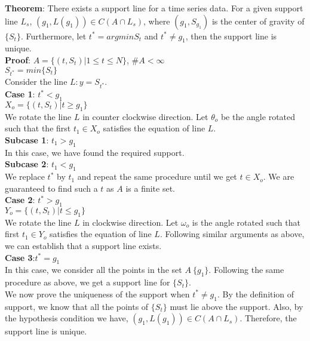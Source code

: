\documentclass{article}
\begin{document}
\maketitle

\noindent
\textbf{Theorem}: There exists a support line for a time series data. For a given support line $L_s$, $(g_1,L(g_1))\in C(A \cap L_s)$, where $(g_1,S_{g_1})$ is the center of gravity of $\{ S_t\}$. Furthermore, let $t^*=argmin S_t$ and $t^*\ne g_1$, then the support line is unique.\\

\noindent
\textbf{Proof}: $A=\{(t,S_t)|1\leq t\leq N\}$, $\# A<\infty$\\
$S_{t^*}=min\{ S_t\}$\\
Consider the line $L:y=S_{t^*}$.\\

\textbf{Case 1}: $t^*<g_1$\\
$X_o=\{(t,S_t)|t\geq g_1\}$\\
We rotate the line $L$ in counter clockwise direction.
Let $\theta_o$ be the angle rotated such that the first $t_1\in X_o$ satisfies the equation of line $L$.\\
\textbf{Subcase 1}: $t_1>g_1$\\
In this case, we have found the required support.\\
\textbf{Subcase 2}: $t_1<g_1$\\
We replace $t^*$ by $t_1$ and repeat the same procedure until we get $t\in X_o$. We are guaranteed to find such a $t$ as $A$ is a finite set.\\

\textbf{Case 2}: $t^*>g_1$\\
$Y_o=\{(t,S_t)|t\leq g_1\}$\\
We rotate the line $L$ in clockwise direction. Let $\omega_o$ is the angle rotated such that first $t_1\in Y_o$ satisfies the equation of line $L$. Following similar arguments as above, we can establish that a support line exists.\\

\textbf{Case 3}:$t^*=g_1$\\
In this case, we consider all the points in the set $A\ \{g_1\}$. Following the same procedure as above, we get a support line for $\{S_t\}$.\\

\noindent
We now prove the uniqueness of the support when $t^*\ne g_1$.
By the definition of support, we know that all the points of $\{S_t\}$ must lie above the support. Also, by the hypothesis condition we have, $(g_1,L(g_1))\in C(A \cap L_s)$. Therefore, the support line is unique.
\end{document}
